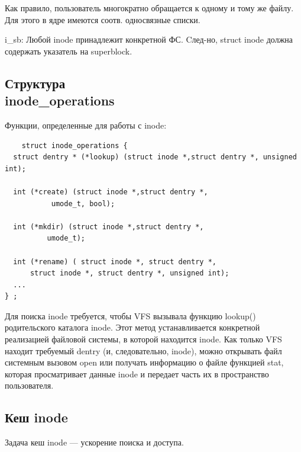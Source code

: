 Как правило, пользователь многократно обращается к одному и тому же файлу. Для этого в ядре имеются соотв. односвязные списки.


i\_sb:  Любой inode принадлежит конкретной ФС. Cлед-но, struct inode должна содержать указатель на superblock.

\subsection{Структура \\ inode\_operations}
Функции, определенные для работы с inode:
\begin{lstlisting}
    struct inode_operations {
  struct dentry * (*lookup) (struct inode *,struct dentry *, unsigned int);
  
  int (*create) (struct inode *,struct dentry *,
           umode_t, bool);

  int (*mkdir) (struct inode *,struct dentry *,
          umode_t);
  
  int (*rename) ( struct inode *, struct dentry *,
      struct inode *, struct dentry *, unsigned int);
  ...
} ;
\end{lstlisting}

Для поиска inode требуется, чтобы VFS вызывала функцию lookup() родительского каталога inode. Этот метод устанавливается конкретной реализацией файловой системы, в которой находится inode. Как только VFS находит требуемый dentry (и, следовательно, inode), можно открывать файл системным вызовом open или получать информацию о файле функцией stat, которая просматривает данные inode и передает часть их в пространство пользователя.


\subsection{Кеш inode}
Задача кеш inode --- ускорение поиска и доступа.

